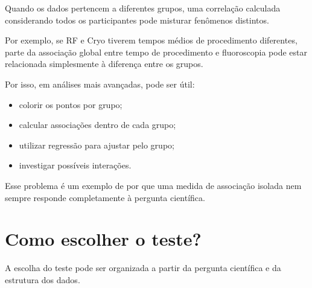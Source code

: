 \begin{deepdive}
Quando os dados pertencem a diferentes grupos, uma correlação calculada
considerando todos os participantes pode misturar fenômenos distintos.

Por exemplo, se RF e Cryo tiverem tempos médios de procedimento diferentes,
parte da associação global entre tempo de procedimento e fluoroscopia pode
estar relacionada simplesmente à diferença entre os grupos.

Por isso, em análises mais avançadas, pode ser útil:

\begin{itemize}
    \item colorir os pontos por grupo;
    \item calcular associações dentro de cada grupo;
    \item utilizar regressão para ajustar pelo grupo;
    \item investigar possíveis interações.
\end{itemize}

Esse problema é um exemplo de por que uma medida de associação isolada nem
sempre responde completamente à pergunta científica.
\end{deepdive}

\section{Como escolher o teste?}

A escolha do teste pode ser organizada a partir da pergunta científica e da
estrutura dos dados.

